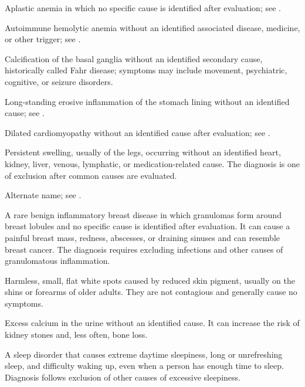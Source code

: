  Aplastic anemia in which no specific cause is identified after evaluation; see .

 Autoimmune hemolytic anemia without an identified associated disease, medicine, or other trigger; see .

 Calcification of the basal ganglia without an identified secondary cause, historically called Fahr disease; symptoms may include movement, psychiatric, cognitive, or seizure disorders.

 Long-standing erosive inflammation of the stomach lining without an identified cause; see .

 Dilated cardiomyopathy without an identified cause after evaluation; see .

 Persistent swelling, usually of the legs, occurring without an identified heart, kidney, liver, venous, lymphatic, or medication-related cause. The diagnosis is one of exclusion after common causes are evaluated.

 Alternate name; see .

 A rare benign inflammatory breast disease in which granulomas form around breast lobules and no specific cause is identified after evaluation. It can cause a painful breast mass, redness, abscesses, or draining sinuses and can resemble breast cancer. The diagnosis requires excluding infections and other causes of granulomatous inflammation.

 Harmless, small, flat white spots caused by reduced skin pigment, usually on the shins or forearms of older adults. They are not contagious and generally cause no symptoms.

 Excess calcium in the urine without an identified cause. It can increase the risk of kidney stones and, less often, bone loss.

 A sleep disorder that causes extreme daytime sleepiness, long or unrefreshing sleep, and difficulty waking up, even when a person has enough time to sleep. Diagnosis follows exclusion of other causes of excessive sleepiness.


